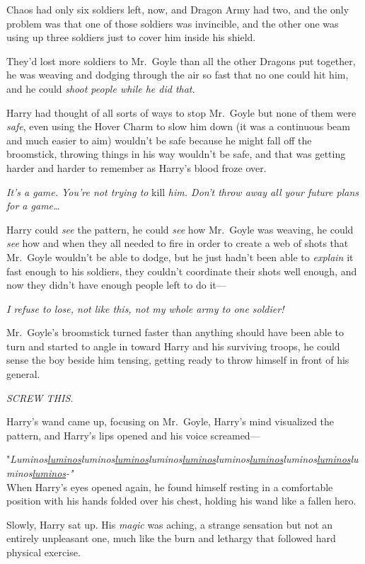 Chaos had only six soldiers left, now, and Dragon Army had two, and the only problem was that one of those soldiers was invincible, and the other one was using up three soldiers just to cover him inside his shield.

They'd lost more soldiers to Mr.~Goyle than all the other Dragons put together, he was weaving and dodging through the air so fast that no one could hit him, and he could \emph{shoot people while he did that.}

Harry had thought of all sorts of ways to stop Mr.~Goyle but none of them were \emph{safe}, even using the Hover Charm to slow him down (it was a continuous beam and much easier to aim) wouldn't be safe because he might fall off the broomstick, throwing things in his way wouldn't be safe, and that was getting harder and harder to remember as Harry's blood froze over.

\emph{It's a game. You're not trying to} kill\emph{ him. Don't throw away all your future plans for a game{\ldots}}

Harry could \emph{see} the pattern, he could \emph{see} how Mr.~Goyle was weaving, he could \emph{see} how and when they all needed to fire in order to create a web of shots that Mr.~Goyle wouldn't be able to dodge, but he just hadn't been able to \emph{explain} it fast enough to his soldiers, they couldn't coordinate their shots well enough, and now they didn't have enough people left to do it---

\emph{I refuse to lose, not like this, not my whole army to one soldier!}

Mr.~Goyle's broomstick turned faster than anything should have been able to turn and started to angle in toward Harry and his surviving troops, he could sense the boy beside him tensing, getting ready to throw himself in front of his general.

\emph{SCREW THIS.}

Harry's wand came up, focusing on Mr.~Goyle, Harry's mind visualized the pattern, and Harry's lips opened and his voice screamed---

"\emph{Luminos\underline{luminos}luminos\underline{luminos}luminos\underline{luminos}luminos\underline{luminos}luminos\underline{luminos}luminos\underline{luminos}-"\\
}
\sbreak
When Harry's eyes opened again, he found himself resting in a comfortable position with his hands folded over his chest, holding his wand like a fallen hero.

Slowly, Harry sat up. His \emph{magic} was aching, a strange sensation but not an entirely unpleasant one, much like the burn and lethargy that followed hard physical exercise.

